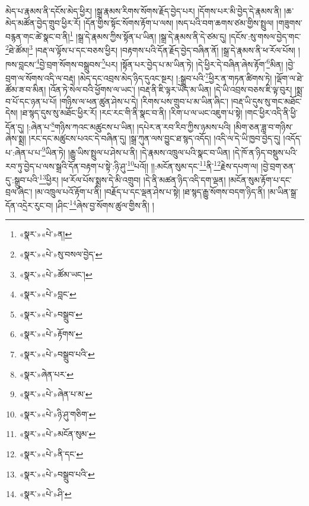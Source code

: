 མེད་པ་རྣམས་ནི་དངོས་མེད་ཕྱིར། །སྒྲ་རྣམས་རིགས་སོགས་རྗོད་བྱེད་པར། །དོགས་པར་མི་བྱེད་དེ་རྣམས་ནི། །ཆ་མེད་མཚོན་བྱེད་གྲུབ་ཕྱིར་རོ། །དོན་གྱིས་སྟོང་སོགས་རྟོག་པ་ལས། །སད་པའི་བག་ཆགས་ཙམ་གྱིས་སྤྲུལ། །གཟུགས་བརྙན་གང་ཚེ་སྣང་བ་ནི།\footnote{«སྣར་»«པེ་»ན།} །སྒྲ་དེ་རྣམས་ཀྱིས་སྟོན་པ་ཡིན། །སྒྲ་དེ་རྣམས་ནི་དེ་ཙམ་དུ། །དངོས་:སུ་གསལ་བྱེད་གང་\footnote{«སྣར་»«པེ་»སུ་བསལ་བྱེད་}ཐེ་ཚོམ།\footnote{«སྣར་»«པེ་»ཚོམ་ཡང་།} །བརྡ་ལ་ལྟོས་པ་དང་བཅས་ཕྱིར། །བརྟགས་པའི་དོན་རྗོད་བྱེད་བཞིན་ནོ། །སྒྲ་དེ་རྣམས་ནི་ཕ་རོལ་པོས། །ཁས་བླངས་\footnote{«སྣར་»«པེ་»བླང་}བྱེ་བྲག་སོགས་བསྒྲུབས་\footnote{«སྣར་»«པེ་»བསྒྲུབ་}པར། །སྟོན་པར་བྱེད་པ་མ་ཡིན་ཏེ། །དེ་ཕྱིར་དེ་བཞིན་ཞེས་རྟོག་\footnote{«སྣར་»«པེ་»རྟོགས་}མིན། །བྱེ་བྲག་ལ་སོགས་འདི་ལ་བརྡ། །མེད་དང་འབྲས་མེད་ཉིད་དུའང་སྔར། །:སྒྲུབ་པའི་\footnote{«སྣར་»«པེ་»བསྒྲུབ་པའི་}ཕྱིར་ན་གཏན་ཚིགས་ཏེ། །ལྡོག་ལ་ཐེ་ཚོམ་ཟ་བ་མིན། །འོན་ཏེ་སེལ་བའི་ཕྱོགས་ལ་ཡང་། །བརྡ་ནི་ཇི་ལྟར་ཡོད་མ་ཡིན། །དེ་ཡི་འབྲས་བཅས་ཇི་ལྟ་བུར། །སྨྲ་བ་པོ་དང་ཉན་པ་པོ། །གཉིས་ལ་ཕན་ཚུན་ཤེས་པ་དེ། །རིགས་པས་གྲུབ་པ་མ་ཡིན་ཞིང་། །བརྡ་ཡི་དུས་སུ་གང་མཐོང་དེས། །ཐ་སྙད་དུས་སུ་མཐོང་ཕྱིར་རོ། །རང་རང་གི་ནི་སྣང་བ་ནི། །རིག་པ་ལ་ཡང་འཇུག་པ་སྟེ། །གང་ཕྱིར་འདི་ནི་ཕྱི་དོན་དུ། །:ཞེན་པ་\footnote{«སྣར་»ཞེན་པར་}གཉིས་ཀའང་མཚུངས་པ་ཡིན། །དཔེར་ན་རབ་རིབ་ཀྱིས་ཉམས་པའི། །མིག་ཅན་ཟླ་བ་གཉིས་ཞེས་སྨྲ། །རང་དང་མཚུངས་པའང་དེ་བཞིན་དུ། །སྒྲ་ཀུན་ལས་བྱུང་ཐ་སྙད་འདོད། །འདི་ལ་དེ་ཡི་ཁྱབ་བྱེད་དུ། །འདོད་པ་:ཞེན་པ་པ་\footnote{«སྣར་»«པེ་»ཞེན་པ་མ་}ཡིན་ཏེ། །རྒྱུ་ཡིས་སྤྲུལ་པ་ཤེས་པ་ནི། །དེ་རྣམས་འཁྲུལ་པའི་སྣང་བ་ཡིན། །དེ་ཁོ་ན་ཉིད་བསྡུས་པའི་རབ་ཏུ་བྱེད་པ་ལས་སྒྲའི་དོན་བརྟག་པ་སྟེ་:ཉི་ཤུ་\footnote{«སྣར་»«པེ་»ཉི་ཤུ་གཅིག་}པའོ།། །།:མངོན་སུམ་དང་\footnote{«སྣར་»«པེ་»མངོན་སུམ་}ནི་\footnote{«སྣར་»«པེ་»ནི་དང་}རྗེས་དཔག་ལ། །བྱེ་བྲག་ཅན་དུ་:སྒྲུབ་པའི་\footnote{«སྣར་»«པེ་»བསྒྲུབ་པའི་}ཕྱིར། །ཕ་རོལ་པོས་སྨྲས་དེ་མི་འགྲུབ། །དེ་ནི་མཚན་ཉིད་འདི་དག་ལྡན། །མངོན་སུམ་རྟོག་པ་དང་བྲལ་ཞིང་། །མ་འཁྲུལ་པའོ་རྟོག་པ་ནི། །བརྗོད་པ་དང་ལྡན་ཤེས་པ་སྟེ། །ཐ་སྙད་རྒྱུ་སོགས་བདག་ཉིད་ནི། །མ་ཡིན་སྒྲ་དོན་འདྲེར་རུང་བ། །ཤིང་\footnote{«སྣར་»«པེ་»ཤི་}ཞེས་བྱ་སོགས་ཚུལ་གྱིས་ནི། །
